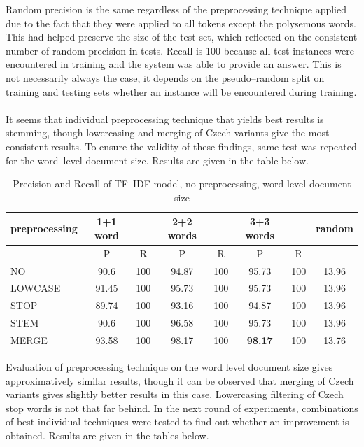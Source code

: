 Random precision is the same regardless of the preprocessing technique applied due to the fact that 
they were applied to all tokens except the polysemous words. This had helped preserve the size of the 
test set, which reflected on the consistent number of random precision in tests. Recall is 100 because all test instances were encountered in training and the system was able to
provide an answer. This is not necessarily always the case, it depends on the pseudo--random split on 
training and testing sets  whether an instance will be encountered during training. 
\\\\
It seems that individual 
 preprocessing technique that yields best results is stemming, though lowercasing and merging of Czech variants give the most consistent results. To ensure the validity of these findings, same test was repeated for the word--level document size. Results are given in the table below.  
\begin{table}[h!]
\begin{tabular}{ l | c c | c c | c c | c}
   preprocessing & 1+1 word && 2+2 words && 3+3 words  && random\\
\hline\hline
	& P  &  R & P  &  R & P  &  R &\\
\hline
NO  & 90.6 & 100 & 94.87 & 100 & 95.73 & 100 & 13.96 \\
LOWCASE  & 91.45 & 100 & 95.73 & 100 & 95.73 & 100 & 13.96 \\
 STOP  & 89.74 & 100 & 93.16 & 100 & 94.87 & 100 & 13.96  \\
 STEM  & 90.6 & 100 & 96.58 & 100 & 95.73 & 100 & 13.96 \\
MERGE  & 93.58 & 100 & 98.17 & 100 & \textbf{98.17} & 100 & 13.76  \\
\end{tabular}
\caption{Precision and Recall of TF--IDF model, no preprocessing, word level document size}
\end{table}

Evaluation of preprocessing technique on the word level document size gives approximatively similar results, though it can be observed that merging of Czech variants gives slightly better results in this case. Lowercasing filtering of Czech stop words is not that far behind. In the next round of experiments, combinations of best individual techniques were tested to find out whether an improvement is obtained. 
Results are given in the tables below. 


